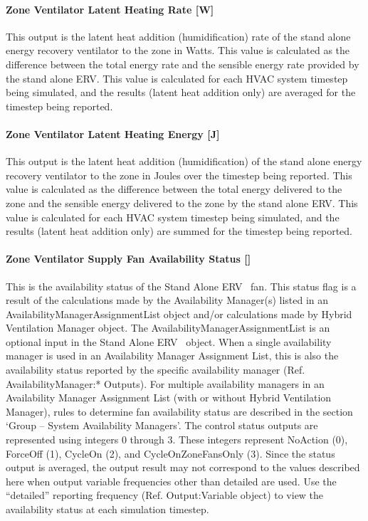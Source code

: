 \paragraph{Zone Ventilator Latent Heating Rate {[}W{]}}\label{zone-ventilator-latent-heating-rate-w}

This output is the latent heat addition (humidification) rate of the stand alone energy recovery ventilator to the zone in Watts. This value is calculated as the difference between the total energy rate and the sensible energy rate provided by the stand alone ERV. This value is calculated for each HVAC system timestep being simulated, and the results (latent heat addition only) are averaged for the timestep being reported.

\paragraph{Zone Ventilator Latent Heating Energy {[}J{]}}\label{zone-ventilator-latent-heating-energy-j}

This output is the latent heat addition (humidification) of the stand alone energy recovery ventilator to the zone in Joules over the timestep being reported. This value is calculated as the difference between the total energy delivered to the zone and the sensible energy delivered to the zone by the stand alone ERV. This value is calculated for each HVAC system timestep being simulated, and the results (latent heat addition only) are summed for the timestep being reported.

\paragraph{Zone Ventilator Supply Fan Availability Status {[]}}\label{zone-ventilator-supply-fan-availability-status}

This is the availability status of the Stand Alone ERV~ fan. This status flag is a result of the calculations made by the Availability Manager(s) listed in an AvailabilityManagerAssignmentList object and/or calculations made by Hybrid Ventilation Manager object. The AvailabilityManagerAssignmentList is an optional input in the Stand Alone ERV~ object. When a single availability manager is used in an Availability Manager Assignment List, this is also the availability status reported by the specific availability manager (Ref. AvailabilityManager:* Outputs). For multiple availability managers in an Availability Manager Assignment List (with or without Hybrid Ventilation Manager), rules to determine fan availability status are described in the section `Group -- System Availability Managers'. The control status outputs are represented using integers 0 through 3. These integers represent NoAction (0), ForceOff (1), CycleOn (2), and CycleOnZoneFansOnly (3). Since the status output is averaged, the output result may not correspond to the values described here when output variable frequencies other than detailed are used. Use the ``detailed'' reporting frequency (Ref. Output:Variable object) to view the availability status at each simulation timestep.

